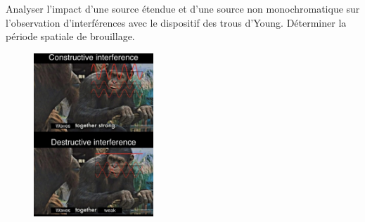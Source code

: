 \documentclass{article}
\begin{document}
Analyser l'impact d'une source étendue et d'une source non monochromatique sur l'observation d'interférences avec le dispositif des trous d'Young. 
Déterminer la période spatiale de brouillage. \\[3cm]


\begin{figure}[h]
  \centering
  \includegraphics[width=0.4\textwidth]{meme_singes.jpg}
\end{figure}
\end{document}
